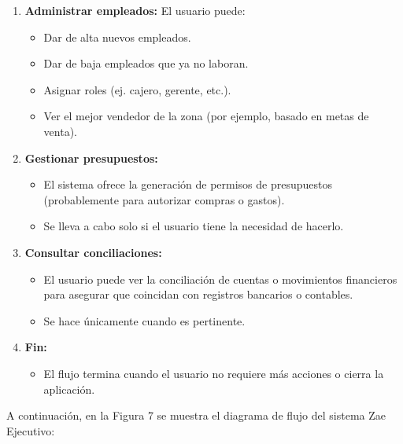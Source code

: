 \documentclass[protocolo.tex]{subfiles}
\begin{document}
\begin{enumerate}
\begin{itemize}
        
    \end{itemize}
    \item \textbf{Administrar empleados:}
    El usuario puede:
    \begin{itemize}
        \item Dar de alta nuevos empleados.
        \item Dar de baja empleados que ya no laboran.
        \item Asignar roles (ej. cajero, gerente, etc.).
        \item Ver el mejor vendedor de la zona (por ejemplo, basado en metas de venta).
        

    \end{itemize}
    \item \textbf{Gestionar presupuestos:} 
   \begin{itemize}
        \item El sistema ofrece la generación de permisos de presupuestos (probablemente para autorizar compras o gastos).
        \item Se lleva a cabo solo si el usuario tiene la necesidad de hacerlo.

    \end{itemize}
    \item \textbf{Consultar conciliaciones:}
    \begin{itemize}
        \item El usuario puede ver la conciliación de cuentas o movimientos financieros para asegurar que coincidan con registros bancarios o contables.
        \item Se hace únicamente cuando es pertinente.

    \end{itemize}
    \item \textbf{Fin:}  
    \begin{itemize}
        \item El flujo termina cuando el usuario no requiere más acciones o cierra la aplicación.
    \end{itemize}
\end{enumerate}

A continuación, en la Figura 7 se muestra el diagrama de flujo del sistema Zae Ejecutivo:\vspace{4mm}
\end{document}

